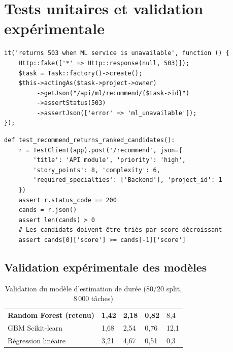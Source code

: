 \section{Tests unitaires et validation expérimentale}

\begin{lstlisting}[style=phpstyle,caption={Tests unitaires Laravel — MLController},label={lst:tests_s5_php}]
it('returns 503 when ML service is unavailable', function () {
    Http::fake(['*' => Http::response(null, 503)]);
    $task = Task::factory()->create();
    $this->actingAs($task->project->owner)
         ->getJson("/api/ml/recommend/{$task->id}")
         ->assertStatus(503)
         ->assertJson(['error' => 'ml_unavailable']);
});
\end{lstlisting}

\begin{lstlisting}[style=pythonstyle,caption={Tests unitaires Python — FastAPI},label={lst:tests_s5_py}]
def test_recommend_returns_ranked_candidates():
    r = TestClient(app).post('/recommend', json={
        'title': 'API module', 'priority': 'high',
        'story_points': 8, 'complexity': 6,
        'required_specialties': ['Backend'], 'project_id': 1
    })
    assert r.status_code == 200
    cands = r.json()
    assert len(cands) > 0
    # Les candidats doivent être triés par score décroissant
    assert cands[0]['score'] >= cands[-1]['score']
\end{lstlisting}

\subsection{Validation expérimentale des modèles}

\begin{table}[H]
  \centering
  \caption{Validation du modèle d'estimation de durée (80/20 split, 8\,000 tâches)}
  \label{tab:valid_duree}
  \begin{tabularx}{\textwidth}{L{4.5cm}C{2.5cm}C{2.5cm}C{2cm}C{2.5cm}}
    \toprule
     &  &  &  &  \\
    \midrule
    \textbf{Random Forest (retenu)} & \textbf{1,42} & \textbf{2,18} & \textbf{0,82} & 8,4 \\
    GBM Scikit-learn & 1,68 & 2,54 & 0,76 & 12,1 \\
    Régression linéaire & 3,21 & 4,67 & 0,51 & 0,3 \\
    \bottomrule
  \end{tabularx}
\end{table}

